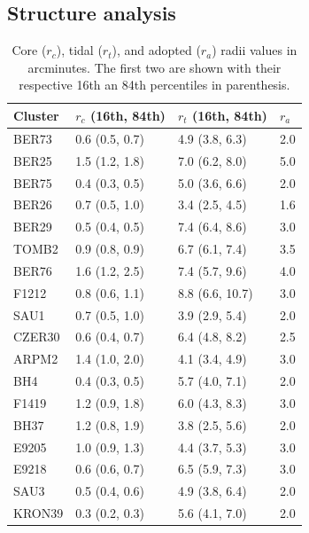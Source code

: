 \documentclass[referee]{aa}
\begin{document}
\begin{appendix}

\section{Structure analysis}
 \label{app:struct_analysis}

 \begin{table}
 \caption{Core ($r_{c}$), tidal ($r_{t}$), and adopted ($r_{a}$) radii values
 in arcminutes. The first two are shown with their respective 16th an 84th
 percentiles in parenthesis.}
 \label{tab:radii}
 \centering
 \begin{tabular}{llll}
 \hline\hline
 Cluster & $r_{c}$ (16th, 84th) &  $r_{t}$ (16th, 84th) & $r_{a}$\\
 \hline
  BER73         & 0.6 (0.5, 0.7) &  4.9 (3.8, 6.3) &  2.0\\
  BER25         & 1.5 (1.2, 1.8) &  7.0 (6.2, 8.0) &  5.0\\
  BER75         & 0.4 (0.3, 0.5) &  5.0 (3.6, 6.6) &  2.0\\
  BER26         & 0.7 (0.5, 1.0) &  3.4 (2.5, 4.5) &  1.6\\
  BER29         & 0.5 (0.4, 0.5) &  7.4 (6.4, 8.6) &  3.0\\
  TOMB2         & 0.9 (0.8, 0.9) &  6.7 (6.1, 7.4) &  3.5\\
  BER76         & 1.6 (1.2, 2.5) &  7.4 (5.7, 9.6) &  4.0\\
  F1212         & 0.8 (0.6, 1.1) &  8.8 (6.6, 10.7) & 3.0\\
  SAU1          & 0.7 (0.5, 1.0) &  3.9 (2.9, 5.4) &  2.0\\
  CZER30        & 0.6 (0.4, 0.7) &  6.4 (4.8, 8.2) &  2.5\\
  ARPM2         & 1.4 (1.0, 2.0) &  4.1 (3.4, 4.9) &  3.0\\
  BH4           & 0.4 (0.3, 0.5) &  5.7 (4.0, 7.1) &  2.0\\
  F1419         & 1.2 (0.9, 1.8) &  6.0 (4.3, 8.3) &  3.0\\
  BH37          & 1.2 (0.8, 1.9) &  3.8 (2.5, 5.6) &  2.0\\
  E9205         & 1.0 (0.9, 1.3) &  4.4 (3.7, 5.3) &  3.0\\
  E9218         & 0.6 (0.6, 0.7) &  6.5 (5.9, 7.3) &  3.0\\
  SAU3          & 0.5 (0.4, 0.6) &  4.9 (3.8, 6.4) &  2.0\\
  KRON39        & 0.3 (0.2, 0.3) &  5.6 (4.1, 7.0) &  2.0\\

\end{tabular}
\end{table}
\end{appendix}
\end{document}
